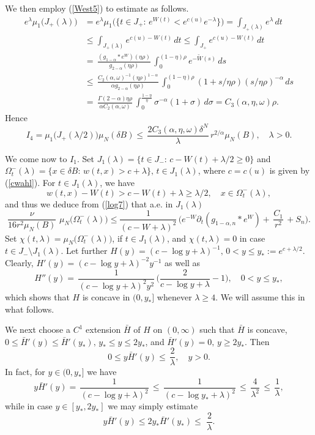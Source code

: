 \documentclass[10pt]{article}
\begin{document}
We then employ (\ref{West5}) to estimate as follows.
\begin{align*}
e^\lambda \mu_1\big(J_+(\lambda)\big) & = e^\lambda\mu_1\big(\{t\in
J_+:\,
e^{W(t)}<e^{c(u)}e^{-\lambda}\}\big)=\int_{J_+(\lambda)}e^\lambda \,dt\\
& \le \int_{J_+(\lambda)}e^{c(u)-W(t)} \,dt\le
\int_{J_+}e^{c(u)-W(t)} \,dt\\
& = \,\frac{(g_{1-\alpha}\ast
e^W)(\eta\rho)}{g_{2-\alpha}(\eta\rho)}\,\int_0^{(1-\eta)\rho}
e^{-\tilde{W}(s)}\,ds\\
& \le \,\frac{C_2(\alpha,\omega)^{-1}(\eta\rho)^{1-\alpha}}{\alpha
g_{2-\alpha}(\eta\rho)}\,\int_0^{(1-\eta)\rho}(1+s/\eta\rho)(s/\eta\rho)^{-\alpha}\,ds\\
& = \,\frac{\Gamma(2-\alpha)\eta\rho}{\alpha
C_2(\alpha,\omega)}\,\int_0^{\frac{1-\eta}{\eta}}
\sigma^{-\alpha}(1+\sigma)\,d\sigma=C_3(\alpha,\eta,\omega)\rho.
\end{align*}
Hence
\begin{equation} \label{I4est}
I_4=\mu_1\big(J_+(\lambda/2)\big)\mu_N(\delta
B)\le\,\frac{2C_3(\alpha,\eta,\omega)
\delta^N}{\lambda}\,r^{2/\alpha}\mu_N(B),\quad \lambda>0.
\end{equation}

We come now to $I_1$. Set $J_1(\lambda)=\{t\in
J_-:\,c-W(t)+\lambda/2\ge 0\}$ and $\Omega^-_t(\lambda)=\{x\in
\delta B:\,w(t,x)>c+\lambda\},\,t\in J_1(\lambda)$, where $c=c(u)$
is given by (\ref{cwahl}). For $t\in J_1(\lambda)$, we have
\[ w(t,x)-W(t)>c-W(t)+\lambda\ge \lambda/2,\quad x\in
\Omega^-_t(\lambda),\] and thus we deduce from (\ref{log7}) that
a.e. in $J_1(\lambda)$
\begin{equation} \label{log8}
\frac{\nu}{16r^2
\mu_N(B)}\,\,\mu_N\big(\Omega^-_t(\lambda)\big)\le
\frac{1}{(c-W+\lambda)^2}\,\Big(e^{-W}
\partial_t(g_{1-\alpha,n}\ast
e^W)+\,\frac{C_1}{r^2}\,+S_n\Big).
\end{equation}
Set $\chi(t,\lambda)=\mu_N\big(\Omega^-_t(\lambda)\big)$, if $t\in
J_1(\lambda)$, and $\chi(t,\lambda)=0$ in case $t\in J_-\setminus
J_1(\lambda)$. Let further $H(y)=(c-\log y+\lambda)^{-1},\,0<y\le
y_*:=e^{c+\lambda/2}$. Clearly, $H'(y)= (c-\log
y+\lambda)^{-2}y^{-1}$ as well as
\[ H''(y)=\,\frac{1}{(c-\log y+\lambda)^2 y^2}\,\Big(\frac{2}{c-\log
y+\lambda}-1\Big),\quad 0<y\le y_*,\] which shows that $H$ is
concave in $(0,y_*]$ whenever $\lambda\ge 4$. We will assume this in
what follows.

We next choose a $C^1$ extension $\bar{H}$ of $H$ on $(0,\infty)$
such that $\bar{H}$ is concave, $0\le\bar{H}'(y)\le
\bar{H}'(y_*),\,y_*\le y \le 2 y_*$, and $\bar{H}'(y)=0,\,y\ge 2
y_*$. Then
\begin{equation} \label{log8a}
 0\le y\bar{H}'(y)\le
\,\frac{2}{\lambda},\quad y>0.
\end{equation}
In fact, for $y\in(0,y_*]$ we have
\begin{equation} \label{log8aa}
y\bar{H}'(y)=\,\frac{1}{(c-\log y+\lambda)^2}\,\le
\,\frac{1}{(c-\log y_*+\lambda)^2}\,\le \,\frac{4}{\lambda^2}\,\le
\,\frac{1}{\lambda},
\end{equation}
while in case $y\in[y_*,2y_*]$ we may simply estimate
\[
y\bar{H}'(y)\le 2y_*\bar{H}'(y_*)\le \,\,\frac{2}{\lambda}.
\]
\end{document}
